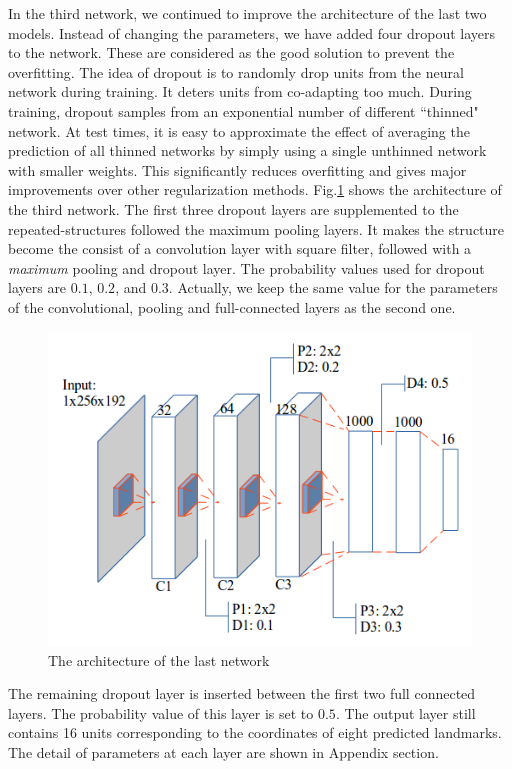 \documentclass[conference]{IEEEtran}
\begin{document}
In the third network, we continued to improve the architecture of the last two models. Instead of changing the parameters, we have added four dropout layers to the network. These are considered as the good solution to prevent the overfitting. The idea of dropout is to randomly drop units from the neural network during training. It deters units from co-adapting too much. During training, dropout samples from an exponential number of different ``thinned" network. At test times, it is easy to approximate the effect of averaging the prediction of all thinned networks by simply using a single unthinned network with smaller weights. This significantly reduces overfitting and gives major improvements over other regularization methods\cite{srivastava2014dropout}. Fig.\ref{figarch} shows the architecture of the third network. The first three dropout layers are supplemented to the repeated-structures followed the maximum pooling layers. It makes the structure become the consist of a convolution layer with square filter, followed with a \textit{maximum} pooling and dropout layer. The probability values used for dropout layers are $0.1$, $0.2$, and $0.3$. Actually, we keep the same value for the parameters of the convolutional, pooling and full-connected layers as the second one.

\begin{figure}[htbp]
	\centerline{\includegraphics[scale=0.45]{images/architecture3}}
	\caption{The architecture of the last network}
	\label{figarch}
\end{figure}

The remaining dropout layer is inserted between the first two full connected layers. The probability value of this layer is set to $0.5$. The output layer still contains 16 units corresponding to the coordinates of eight predicted landmarks. The detail of parameters at each layer are shown in Appendix section. 
\end{document}
